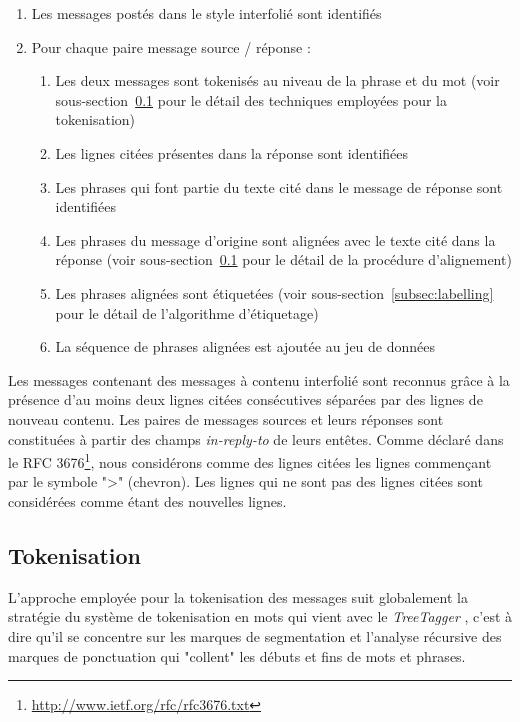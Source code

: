 \begin{enumerate}
    \item Les messages postés dans le style interfolié sont identifiés
    \item Pour chaque paire message source / réponse :
    \begin{enumerate}
        \item Les deux messages sont tokenisés au niveau de la phrase et du mot (voir sous-section~\ref{subsec:tokenization} pour le détail des techniques employées pour la tokenisation)
        \item Les lignes citées présentes dans la réponse sont identifiées
        \item Les phrases qui font partie du texte cité dans le message de réponse sont identifiées
        \item Les phrases du message d'origine sont alignées avec le texte cité dans la réponse (voir sous-section~\ref{subsec:tokenization} pour le détail de la procédure d'alignement)
        \item Les phrases alignées sont étiquetées (voir sous-section~\ref{subsec:labelling} pour le détail de l'algorithme d'étiquetage)
        \item La séquence de phrases alignées est ajoutée au jeu de données
    \end{enumerate}
\end{enumerate}

Les messages contenant des messages à contenu interfolié sont reconnus grâce à la présence d'au moins deux lignes citées consécutives séparées par des lignes de nouveau contenu. Les paires de messages sources et leurs réponses sont constituées à partir des champs \emph{in-reply-to} de leurs entêtes. Comme déclaré dans le RFC 3676\footnote{\url{http://www.ietf.org/rfc/rfc3676.txt}}, nous considérons comme des lignes citées les lignes commençant par le symbole "\textgreater" (chevron). Les lignes qui ne sont pas des lignes citées sont considérées comme étant des nouvelles lignes. 


\subsection{Tokenisation}

\label{subsec:tokenization}

L'approche employée pour la tokenisation des messages suit globalement la stratégie du système de tokenisation en mots qui vient avec le \textit{TreeTagger} \cite{schmid:94b}, c'est à dire qu'il se concentre sur les marques de segmentation et l'analyse récursive des marques de ponctuation qui "collent" les débuts et fins de mots et phrases.

